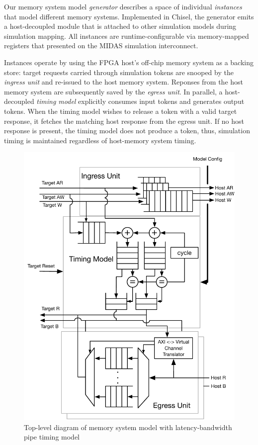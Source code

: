 
Our memory system model \textit{generator} describes a space of individual
\textit{instances} that model different memory systems. Implemented in
Chisel\cite{Chisel}, the generator emits a host-decoupled module that is
attached to other simulation models during simulation mapping. All instances
are runtime-configurable via memory-mapped registers that presented on the
MIDAS simulation interconnect.

Instances operate by using the FPGA host's off-chip memory system as a backing
store: target requests carried through simulation tokens are snooped by the
\emph{ingress unit} and re-issued to the host memory system. Reponses from the
host memory system are subsequently saved by the \emph{egress unit}.  In
parallel, a host-decoupled \emph{timing model} explicitly consumes input tokens
and generates output tokens. When the timing model wishes to release a token
with a valid target response, it fetches the matching host response from the
egress unit. If no host response is present, the timing model does not produce
a token, thus, simulation timing is maintained regardless of host-memory system
timing.

\begin{figure}
	\centering
	\includegraphics[width=\columnwidth]{figures/memory-model-block-diagram.pdf}
	\caption{Top-level diagram of memory system model with latency-bandwidth pipe timing model}
	\label{fig:timing_model}
\end{figure}

